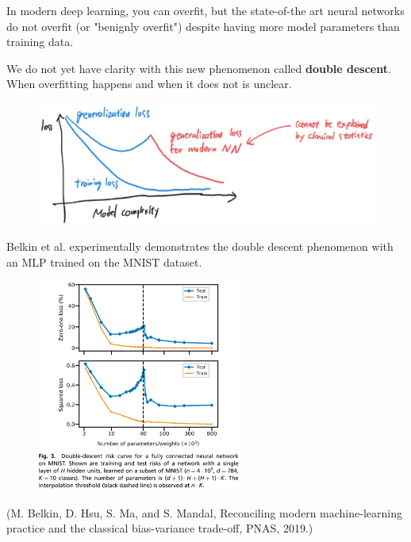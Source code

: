 \documentclass{report}
\begin{document}
\begin{definition}
    In modern deep learning, you can overfit, but the state-of-the art neural networks do not overfit (or "benignly overfit") despite having more model parameters than training data.

    We do not yet have clarity with this new phenomenon called \textbf{double descent}. When overfitting happens and when it does not is unclear.

    \begin{figure}[H]
        \centering
        \includegraphics[width=1.0\textwidth]{.././assets/6.4.jpg}
    \end{figure}
\end{definition}

\begin{example}
    Belkin et al. experimentally demonstrates the double descent phenomenon with an MLP trained on the MNIST dataset.

    \begin{figure}[H]
        \centering
        \includegraphics[width=0.6\textwidth]{.././assets/6.5.png}
    \end{figure}

    (M. Belkin, D. Hsu, S. Ma, and S. Mandal, Reconciling modern machine-learning practice and the classical bias-variance trade-off, PNAS, 2019.)
\end{example}
\end{document}

